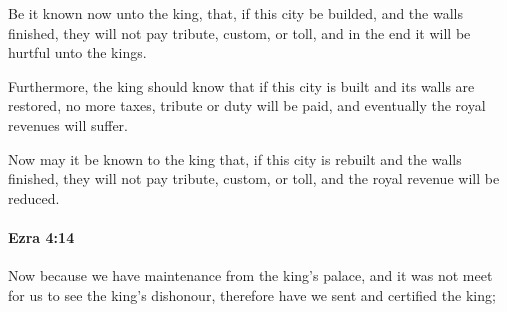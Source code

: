 			\begin{versebox}
					\item[BHS] 
					\item[LXX] 
					\item[ASV] Be it known now unto the king, that, if this city be builded, and the walls finished, they will not pay tribute, custom, or toll, and in the end it will be hurtful unto the kings.
					\item[NIV] Furthermore, the king should know that if this city is built and its walls are restored, no more taxes, tribute or duty will be paid, and eventually the royal revenues will suffer.
					\item[NRSV] Now may it be known to the king that, if this city is rebuilt and the walls finished, they will not pay tribute, custom, or toll, and the royal revenue will be reduced.
			\end{versebox}

		\paragraph{Ezra 4:14} %
			\label{EZRA-4-14}

			Now because we have maintenance from the king’s palace, and it was not meet for us to see the king’s dishonour, therefore have we sent and certified the king;

